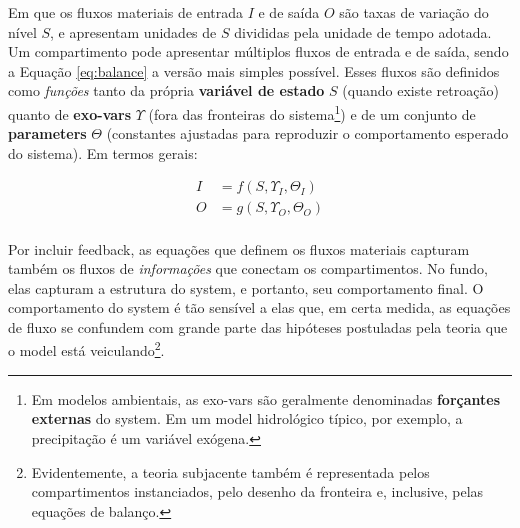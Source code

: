 \documentclass[./main.tex]{subfiles}
\begin{document}
Em que os fluxos materiais de entrada $I$ e de saída $O$ são taxas de variação do nível $S$, e apresentam unidades de $S$ divididas pela unidade de tempo adotada. Um compartimento pode apresentar múltiplos fluxos de entrada e de saída, sendo a Equação \eqref{eq:balance} a versão mais simples possível. Esses fluxos são definidos como \textit{funções} tanto da própria \textbf{variável de estado} $S$ (quando existe retroação) quanto de \textbf{\gls{exo-vars}} $\Upsilon$ (fora das fronteiras do sistema\footnote{Em modelos ambientais, as \gls{exo-vars} são geralmente denominadas \textbf{forçantes externas} do \gls{system}. Em um \gls{model} hidrológico típico, por exemplo, a precipitação é um variável exógena.}) e de um conjunto de \textbf{\gls{parameters}} $\Theta$ (constantes ajustadas para reproduzir o comportamento esperado do sistema). Em termos gerais:
\begin{linenomath*}
\begin{equation}
\label{eq:flows}
\begin{split}
    I &= f(S, \Upsilon_{I}, \Theta_{I})\\
    O &= g(S, \Upsilon_{O}, \Theta_{O})\\
\end{split}
\end{equation}
\end{linenomath*}
Por incluir \gls{feedback}, as equações que definem os fluxos materiais capturam também os fluxos de \textit{informações} que conectam os compartimentos. No fundo, elas capturam a estrutura do \gls{system}, e portanto, seu comportamento final. O comportamento do \gls{system} é tão sensível a elas que, em certa medida, as equações de fluxo se confundem com grande parte das hipóteses postuladas pela \gls{teoria} que o \gls{model} está veiculando\footnote{Evidentemente, a \gls{teoria} subjacente também é representada pelos compartimentos instanciados, pelo desenho da fronteira e, inclusive, pelas equações de balanço.}. 
\end{document}
